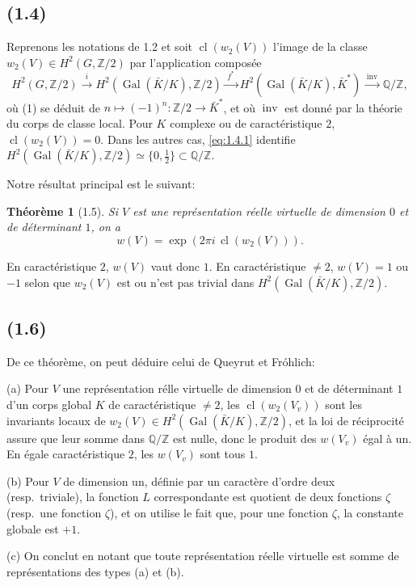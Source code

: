 \documentclass[11pt]{amsart}
\theoremstyle{plain}
\newtheorem{theoreme}{Th\'eor\`eme}[section]
\theoremstyle{definition}
\DeclareMathOperator{\Gal}{Gal}
\DeclareMathOperator{\inv}{inv}
\DeclareMathOperator{\cl}{cl}
\newcommand{\Z}{\mathbb{Z}}
\newcommand{\Q}{\mathbb{Q}}
\begin{document}
\subsection{(1.4)}
Reprenons les notations de 1.2 et soit $\cl(w_2(V))$ l'image de la classe $w_2(V)\in H^2(G,\Z/2)$ par l'application compos\'ee
\begin{equation}\label{eq:1.4.1}
H^2(G,\Z/2)\xrightarrow{\;i\;} H^2(\Gal(\bar K/K),\Z/2)\xrightarrow{\;f^*\;} H^2(\Gal(\bar K/K),\bar K^*)\xrightarrow{\;\inv\;}\Q/\Z,
\end{equation}
o\`u (1) se d\'eduit de $n\mapsto(-1)^n\colon\Z/2\to\bar K^*$, et o\`u $\inv$ est donn\'e par la th\'eorie du corps de classe local. Pour $K$ complexe ou de caract\'eristique $2$, $\cl(w_2(V))=0$. Dans les autres cas, \eqref{eq:1.4.1} identifie $H^2(\Gal(\bar K/K),\Z/2)\simeq\{0,\tfrac12\}\subset\Q/\Z$.

Notre r\'esultat principal est le suivant:

\begin{theoreme}[1.5]\label{thm:1.5}
Si $V$ est une repr\'esentation r\'eelle virtuelle de dimension $0$ et de d\'eterminant $1$, on a
\[
w(V)=\exp(2\pi i\,\cl(w_2(V))).
\]
\end{theoreme}

En caract\'eristique $2$, $w(V)$ vaut donc $1$. En caract\'eristique $\neq2$, $w(V)=1$ ou $-1$ selon que $w_2(V)$ est ou n'est pas trivial dans $H^2(\Gal(\bar K/K),\Z/2)$.

\subsection{(1.6)}
De ce th\'eor\`eme, on peut d\'eduire celui de Queyrut et Fr\'ohlich:

(a) Pour $V$ une repr\'esentation r\'elle virtuelle de dimension $0$ et de d\'eterminant $1$ d'un corps global $K$ de caract\'eristique $\neq2$, les $\cl(w_2(V_v))$ sont les invariants locaux de $w_2(V)\in H^2(\Gal(\bar K/K),\Z/2)$, et la loi de r\'eciprocit\'e assure que leur somme dans $\Q/\Z$ est nulle, donc le produit des $w(V_v)$ \'egal \`a un. En \'egale caract\'eristique $2$, les $w(V_v)$ sont tous $1$.

(b) Pour $V$ de dimension un, d\'efinie par un caract\`ere d'ordre deux (resp.~triviale), la fonction $L$ correspondante est quotient de deux fonctions $\zeta$ (resp.~une fonction $\zeta$), et on utilise le fait que, pour une fonction $\zeta$, la constante globale est $+1$.

(c) On conclut en notant que toute repr\'esentation r\'eelle virtuelle est somme de repr\'esentations des types (a) et (b).
\end{document}
